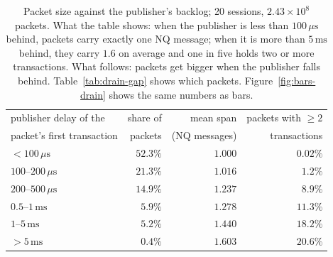 \documentclass[11pt]{article}
\begin{document}
\begin{table}[H]
\centering
\small
\begin{tabular}{@{}l r r r@{}}
\toprule
publisher delay of the & share of & mean span & packets with $\ge 2$ \\
packet's first transaction & packets & (NQ messages) & transactions \\
\midrule
$< 100\,\mu\mathrm{s}$           & $52.3\%$ & $1.000$ & $0.02\%$ \\
$100$--$200\,\mu\mathrm{s}$      & $21.3\%$ & $1.016$ & $1.2\%$ \\
$200$--$500\,\mu\mathrm{s}$      & $14.9\%$ & $1.237$ & $8.9\%$ \\
$0.5$--$1\,\mathrm{ms}$          & $5.9\%$  & $1.278$ & $11.3\%$ \\
$1$--$5\,\mathrm{ms}$            & $5.2\%$  & $1.440$ & $18.2\%$ \\
$> 5\,\mathrm{ms}$               & $0.4\%$  & $1.603$ & $20.6\%$ \\
\bottomrule
\end{tabular}
\caption{Packet size against the publisher's backlog; 20 sessions, $2.43 \times 10^8$
packets. What the table shows: when the publisher is less than $100\,\mu\mathrm{s}$ behind,
packets carry exactly one NQ message; when it is more than $5\,\mathrm{ms}$ behind, they
carry $1.6$ on average and one in five holds two or more transactions. What follows:
packets get bigger when the publisher falls behind. Table~\ref{tab:drain-gap} shows which
packets. Figure~\ref{fig:bars-drain} shows the same numbers as bars.}
\label{tab:drain-delay}
\end{table}
\end{document}
